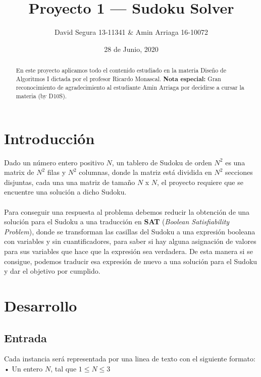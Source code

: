 \documentclass[letterpaper,12pt]{article}
\begin{document}
\title{Proyecto 1 --- Sudoku Solver}
\author{David Segura 13-11341 & Amin Arriaga 16-10072}
\date{28 de Junio, 2020}
\maketitle

\begin{abstract}
En este proyecto aplicamos todo el contenido estudiado en la materia Diseño de Algoritmos I dictada por el profesor Ricardo Monascal. \textbf{Nota especial:} Gran reconocimiento de agradecimiento al estudiante Amin Arriaga por decidirse a cursar la materia (by D10S).
\end{abstract}


\section{Introducción}

Dado un número entero positivo $N$, un tablero de Sudoku de orden $N^2$ es una matrix de $N^2$ filas y
$N^2$ columnas, donde la matriz está dividida en $N^2$ secciones disjuntas, cada una una matriz de tamaño $N$ x $N$, el proyecto requiere que se encuentre una solución a dicho Sudoku.\\
\\
Para conseguir una respuesta al problema debemos reducir la obtención de una solución para el Sudoku a una traducción en \textbf{SAT} (\textit{Boolean Satisfiability Problem}), donde se transforman las casillas del Sudoku a una expresión booleana con variables y sin cuantificadores, para saber si hay alguna asignación de valores para sus variables que hace que la expresión sea verdadera. De esta manera si se consigue, podemos traducir esa expresión de nuevo a una solución para el Sudoku y dar el objetivo por cumplido.

\section{Desarrollo}

\subsection{Entrada}
Cada instancia será representada por una linea de texto con el siguiente formato: \\

• Un entero $N$, tal que $1 \leq N \leq 3$\\
\end{document}
